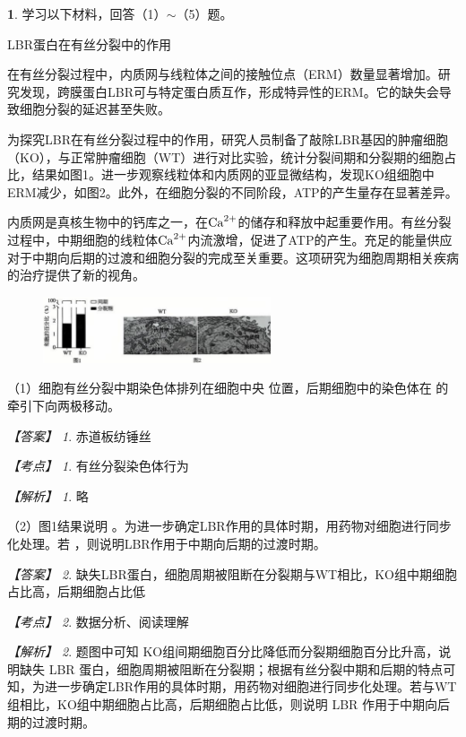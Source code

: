 \documentclass[UTF8, 10pt, a4paper, oneside]{ctexart}
\newcommand{\blank}{ \underbar{\quad$\blacktriangle$\quad} }%
\newcommand{\fs}[1]{{\fangsong #1}}%
\newcommand{\hei}[1]{{\heiti #1}}
\theoremstyle{definition}
\newtheorem{exercise}{}
\theoremstyle{remark}
\newtheorem*{answer}{【答案】}
\newtheorem*{point}{【考点】}      %
\newtheorem*{explanation}{【解析】}     %
\theoremstyle{plain}
\begin{document}
\begin{exercise}
学习以下材料，回答（1）$\sim$（5）题。
\begin{center}
    \hei{LBR蛋白在有丝分裂中的作用}
\end{center}
{\kaishu

在有丝分裂过程中，内质网与线粒体之间的接触位点（ERM）数量显著增加。研究发现，跨膜蛋白LBR可与特定蛋白质互作，形成特异性的ERM。它的缺失会导致细胞分裂的延迟甚至失败。

为探究LBR在有丝分裂过程中的作用，研究人员制备了敲除LBR基因的肿瘤细胞（KO），与正常肿瘤细胞（WT）进行对比实验，统计分裂间期和分裂期的细胞占比，结果如图1。进一步观察线粒体和内质网的亚显微结构，发现KO组细胞中ERM减少，如图2。此外，在细胞分裂的不同阶段，ATP的产生量存在显著差异。

内质网是真核生物中的钙库之一，在$\ce{Ca^2+}$的储存和释放中起重要作用。有丝分裂过程中，中期细胞的线粒体$\ce{Ca^2+}$内流激增，促进了ATP的产生。充足的能量供应对于中期向后期的过渡和细胞分裂的完成至关重要。这项研究为细胞周期相关疾病的治疗提供了新的视角。
}
\begin{figure}[h!]
    \centering
    \includegraphics[width=0.6\textwidth]{assists/17-1.jpg}
\end{figure}

（1）细胞有丝分裂中期染色体排列在细胞中央\blank 位置，后期细胞中的染色体在\blank 的牵引下向两极移动。

\begin{answer}
    赤道板\qquad 纺锤丝
\end{answer}
\begin{point}
    有丝分裂染色体行为
\end{point}
\begin{explanation}
    \fs{略}
\end{explanation}

（2）图1结果说明\blank 。为进一步确定LBR作用的具体时期，用药物对细胞进行同步化处理。若\blank ，则说明LBR作用于中期向后期的过渡时期。

\begin{answer}
    缺失LBR蛋白，细胞周期被阻断在分裂期\qquad 与WT相比，KO组中期细胞占比高，后期细胞占比低
\end{answer}
\begin{point}
    数据分析、阅读理解
\end{point}
\begin{explanation}
    题图中可知 KO组间期细胞百分比降低而分裂期细胞百分比升高，说明缺失 LBR 蛋白，细胞周期被阻断在分裂期；根据有丝分裂中期和后期的特点可知，为进一步确定LBR作用的具体时期，用药物对细胞进行同步化处理。若与WT组相比，KO组中期细胞占比高，后期细胞占比低，则说明 LBR 作用于中期向后期的过渡时期。
\end{explanation}


\end{exercise}
\end{document}
